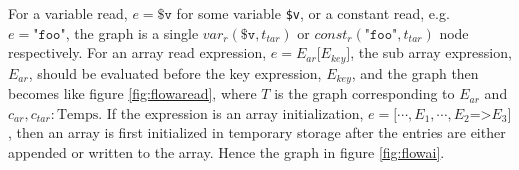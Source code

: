 \begin{figure}
{\begin{adjustbox}{max size={.24\textwidth}{.25\textheight}}
\end{adjustbox}}%
\hspace*{\fill}
\end{figure}

For a variable read, $e = \texttt{\$v}$ for some variable \texttt{\$v}, or a constant read, e.g. $e = \texttt{"foo"}$, the graph is a single $var_r(\texttt{\$v}, t_{tar})$ or $const_r(\texttt{"foo"}, t_{tar})$ node respectively. For an array read expression, $e = E_{ar}\texttt[E_{key}\texttt{]}$, the sub array expression, $E_{ar}$, should be evaluated before the key expression, $E_{key}$, and the graph then becomes like figure \ref{fig:flowaread}, where $T$ is the graph corresponding to $E_{ar}$ and $c_{ar}, c_{tar} : \text{Temps}$. If the expression is an array initialization, $e = \texttt{[}\cdots, E_1, \cdots, E_2\texttt{=>}E_3\texttt{]}$, then an array is first initialized in temporary storage after the entries are either appended or written to the array. Hence the graph in figure \ref{fig:flowai}.
